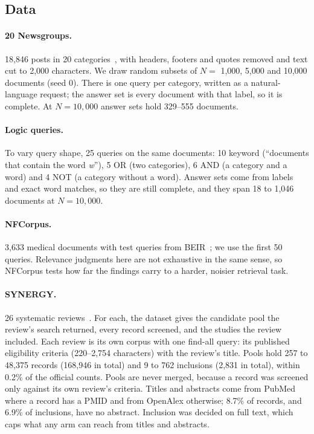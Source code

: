 \documentclass[11pt]{article}
\begin{document}
\subsection{Data}

\paragraph{20 Newsgroups.}
18,846 posts in 20 categories~\cite{lang1995newsweeder}, with headers, footers
and quotes removed and text cut to 2,000 characters. We draw random subsets of
$N =$ 1,000, 5,000 and 10,000 documents (seed 0). There is one query per
category, written as a natural-language request; the answer set is every
document with that label, so it is complete. At $N=10{,}000$ answer sets hold
329--555 documents.

\paragraph{Logic queries.}
To vary query shape, 25 queries on the same documents: 10 keyword
(``documents that contain the word \emph{w}''), 5 OR (two categories), 6 AND
(a category and a word) and 4 NOT (a category without a word). Answer sets
come from labels and exact word matches, so they are still complete, and they
span 18 to 1,046 documents at $N=10{,}000$.

\paragraph{NFCorpus.}
3,633 medical documents with test queries from BEIR~\cite{boteva2016nfcorpus,
thakur2021beir}; we use the first 50 queries. Relevance judgments here are not
exhaustive in the same sense, so NFCorpus tests how far the findings carry to
a harder, noisier retrieval task.

\paragraph{SYNERGY.}
26 systematic reviews~\cite{debruin2023synergy}. For each, the dataset gives the
candidate pool the review's search returned, every record screened, and the
studies the review included. Each review is its own corpus with one find-all
query: its published eligibility criteria (220--2,754 characters) with the
review's title. Pools hold 257 to 48,375 records (168,946 in total) and 9 to 762
inclusions (2,831 in total), within 0.2\% of the official counts. Pools are
never merged, because a record was screened only against its own review's
criteria. Titles and abstracts come from PubMed where a record has a PMID and
from OpenAlex otherwise; 8.7\% of records, and 6.9\% of inclusions, have no
abstract. Inclusion was decided on full text, which caps what any arm can
reach from titles and abstracts.
\end{document}
